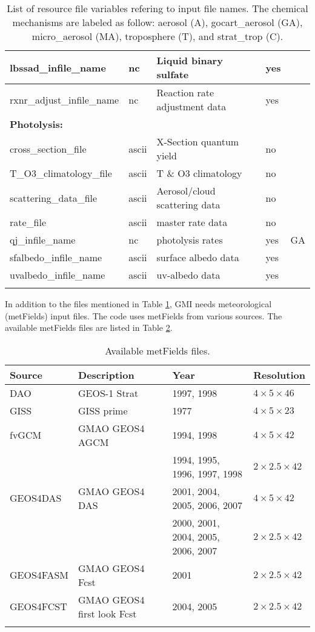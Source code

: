 {\begin{landscape}
\begin{center}
\begin{longtable}{|l|l|l|l|l|}
lbssad\_infile\_name          & nc    & Liquid binary sulfate & yes & \\ \hline
rxnr\_adjust\_infile\_name    & nc    & Reaction rate adjustment data & yes & \\ \hline
\multicolumn{5}{|l|}{\bf Photolysis:} \\ \hline
cross\_section\_file          & ascii & X-Section quantum yield & no & \\ \hline
T\_O3\_climatology\_file      & ascii & T \& O3 climatology  & no & \\ \hline
scattering\_data\_file        & ascii & Aerosol/cloud scattering data & no & \\ \hline
rate\_file                    & ascii & master rate data & no & \\ \hline
qj\_infile\_name              & nc    & photolysis rates & yes & GA \\ \hline
sfalbedo\_infile\_name        & ascii & surface albedo data & yes & \\ \hline
uvalbedo\_infile\_name        & ascii & uv-albedo data  & yes & \\ \hline
\caption{List of resource file variables refering to input file names.
The chemical mechanisms are labeled as follow: aerosol (A), gocart\_aerosol (GA),
micro\_aerosol (MA), troposphere (T), and strat\_trop (C).}
\label{tab:inputFiles}
\end{longtable}
\end{center}

\end{landscape}

}
%
%
In addition to the files mentioned in Table \ref{tab:inputFiles}, GMI needs
meteorological (metFields) input files.
The code uses metFields from various sources. 
The available metFields files are listed in Table \ref{tab:metFieldsFiles}.
%
\begin{center}
\begin{longtable}{|l|l|l|l|} \hline\hline
{\bf Source} & {\bf Description} & {\bf Year} & {\bf Resolution}  \\ \hline\hline
DAO          & GEOS-1 Strat   & 1997, 1998 & $4 \times 5 \times 46$ \\ \hline
GISS         & GISS prime     & 1977       & $4 \times 5 \times 23$ \\ \hline
fvGCM        &GMAO GEOS4 AGCM & 1994, 1998 & $4 \times 5 \times 42$ \\ 
             &             & 1994, 1995, 1996, 1997, 1998 & $2 \times 2.5 \times 42$ \\ \hline
GEOS4DAS     &GMAO GEOS4 DAS & 2001, 2004, 2005, 2006, 2007 & $4 \times 5 \times 42$ \\
             &               & 2000, 2001, 2004, 2005, 2006, 2007 & $2 \times 2.5 \times 42$ \\ \hline
GEOS4FASM    &GMAO GEOS4 Fcst & 2001 & $2 \times 2.5 \times 42$ \\ \hline
GEOS4FCST    &GMAO GEOS4 first look Fcst & 2004, 2005  & $2 \times 2.5 \times 42$ \\ \hline \hline
\caption{Available metFields files.}
\label{tab:metFieldsFiles}
\end{longtable}
\end{center}
